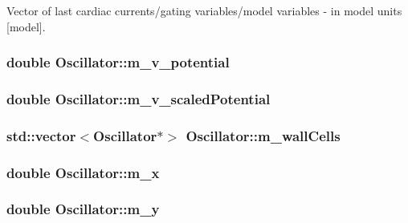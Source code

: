 Vector of last cardiac currents/gating variables/model variables -\/ in model units \mbox{[}model\mbox{]}. 

\hypertarget{class_oscillator_a44d11f6d153d4a061fc1bbb6785ddc18}{
\subsubsection[{m\+\_\+v\+\_\+potential}]{\setlength{\rightskip}{0pt plus 5cm}double Oscillator\+::m\+\_\+v\+\_\+potential}}\label{class_oscillator_a44d11f6d153d4a061fc1bbb6785ddc18}
\hypertarget{class_oscillator_aae4aa22ad331c19871be91d7cc5ceafa}{
\subsubsection[{m\+\_\+v\+\_\+scaled\+Potential}]{\setlength{\rightskip}{0pt plus 5cm}double Oscillator\+::m\+\_\+v\+\_\+scaled\+Potential}}\label{class_oscillator_aae4aa22ad331c19871be91d7cc5ceafa}
\hypertarget{class_oscillator_a74e09a4970c7dff6fd51e99cd399ff22}{
\subsubsection[{m\+\_\+wall\+Cells}]{\setlength{\rightskip}{0pt plus 5cm}std\+::vector$<${\bf Oscillator}$\ast$$>$ Oscillator\+::m\+\_\+wall\+Cells}}\label{class_oscillator_a74e09a4970c7dff6fd51e99cd399ff22}
\hypertarget{class_oscillator_abd8b2a7267f85cae787a0bc77d1f5a5a}{
\subsubsection[{m\+\_\+x}]{\setlength{\rightskip}{0pt plus 5cm}double Oscillator\+::m\+\_\+x}}\label{class_oscillator_abd8b2a7267f85cae787a0bc77d1f5a5a}
\hypertarget{class_oscillator_a6936c789a75680f0486c817af4fce202}{
\subsubsection[{m\+\_\+y}]{\setlength{\rightskip}{0pt plus 5cm}double Oscillator\+::m\+\_\+y}}\label{class_oscillator_a6936c789a75680f0486c817af4fce202}
